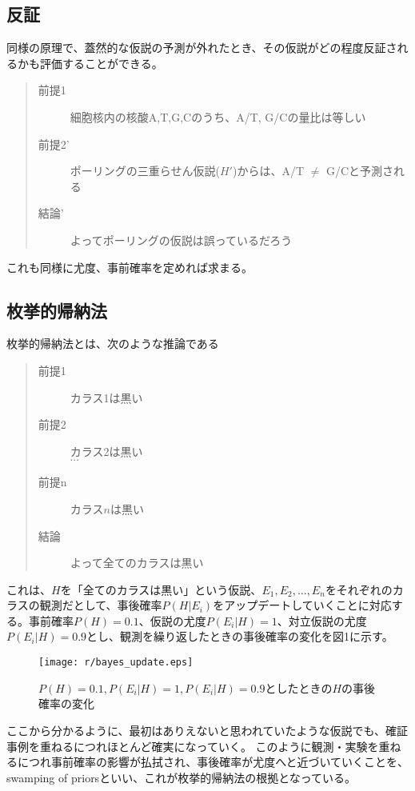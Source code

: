 \documentclass{jsarticle}
\begin{document}
\subsection{反証}
同様の原理で、蓋然的な仮説の予測が外れたとき、その仮説がどの程度反証されるかも評価することができる。
\begin{quote}
 \begin{description}
 \item[前提1] 細胞核内の核酸A,T,G,Cのうち、A/T, G/Cの量比は等しい
 \item[前提2'] ポーリングの三重らせん仮説($H'$)からは、A/T $\neq$ G/Cと予測される
 \item[結論' ] よってポーリングの仮説は誤っているだろう
 \end{description}
\end{quote}
これも同様に尤度、事前確率を定めれば求まる。


\subsection{枚挙的帰納法}
枚挙的帰納法とは、次のような推論である
\begin{quote}
\begin{description}
 \item[前提1] カラス1は黒い
 \item[前提2] カラス2は黒い \\
	    $\cdots$
 \item[前提n] カラス$n$は黒い 
 \item[結論] よって全てのカラスは黒い
\end{description}
\end{quote}
これは、$H$を「全てのカラスは黒い」という仮説、$E_1, E_2, \dots, E_n$をそれぞれのカラスの観測だとして、事後確率$P(H|E_i)$をアップデートしていくことに対応する。事前確率$P(H)=0.1$、仮説の尤度$P(E_i|H)=1$、対立仮説の尤度$P(E_i|H)=0.9$とし、観測を繰り返したときの事後確率の変化を図1に示す。
\begin{figure}[h]
 \centering
 \texttt{[image: r/bayes\_update.eps]}
 \caption{$P(H)=0.1, P(E_i|H)=1, P(E_i|H)=0.9$としたときの$H$の事後確率の変化}
\end{figure}

ここから分かるように、最初はありえないと思われていたような仮説でも、確証事例を重ねるにつれほとんど確実になっていく。
このように観測・実験を重ねるにつれ事前確率の影響が払拭され、事後確率が尤度へと近づいていくことを、swamping of priorsといい、これが枚挙的帰納法の根拠となっている。
\end{document}
